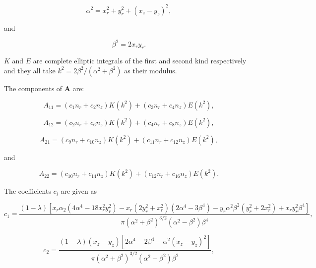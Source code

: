 \documentclass[12pt]{article}
\begin{document}
\begin{equation}
\label{equ:alpha_def}
\alpha^{2} = x_{r}^{2} + y_{r}^{2} + (x_{z} - y_{z})^{2},
\end{equation}

and 

\begin{equation}
\label{equ:beta_def}
\beta^{2} = 2 x_{r} y_{r}.
\end{equation}


$K$ and $E$ are complete elliptic integrals of the first and second kind respectively and they all take $k^{2} = 2 \beta^{2} / (\alpha^{2} + \beta^{2})$ as their modulus. 

The components of $\boldsymbol{A}$ are:

\begin{equation}
\label{equ:A11_comp}
A_{11} = (c_{1} n_{r} + c_{2} n_{z})K(k^{2}) + (c_{3} n_{r} + c_{4} n_{z})E(k^{2}),
\end{equation}

\begin{equation}
\label{equ:A12_comp}
A_{12} = (c_{2} n_{r} + c_{6} n_{z})K(k^{2}) + (c_{4} n_{r} + c_{8} n_{z})E(k^{2}),
\end{equation}

\begin{equation}
\label{equ:A21_comp}
A_{21} = (c_{9} n_{r} + c_{10} n_{z})K(k^{2}) + (c_{11} n_{r} + c_{12} n_{z})E(k^{2}),
\end{equation}

and 

\begin{equation}
\label{equ:A22_comp}
A_{22} = (c_{10} n_{r} + c_{14} n_{z})K(k^{2}) + (c_{12} n_{r} + c_{16} n_{z})E(k^{2}).
\end{equation}

The coefficients $c_{i}$ are given as

\begin{equation}
\label{equ:coeff_a1}
c_{1} = \frac{(1 - \lambda) [x_{r} \alpha_{2} (4 \alpha^{4} - 18 x_{r}^{2} y_{r}^{2}) - x_{r} (2 y_{r}^{2} + x_{r}^{2}) (2 \alpha^{4} - 3 \beta^{4}) - y_{r} \alpha^{2} \beta^{2} (y_{r}^{2} + 2 x_{r}^{2}) + x_{r} y_{r}^{2} \beta^{4}]}{\pi (\alpha^{2} + \beta^{2})^{3/2} (\alpha^{2} - \beta^{2}) \beta^{4}},
\end{equation}

\begin{equation}
\label{equ:equ:coeff_a2}
c_{2} = \frac{(1 - \lambda) (x_{z} - y_{z}) [2 \alpha^{4} - 2 \beta^{4} - \alpha^{2} (x_{z} - y_{z})^{2}]}{\pi (\alpha^{2} + \beta^{2})^{3/2} (\alpha^{2} - \beta^{2}) \beta^{2}},
\end{equation}
\end{document}
